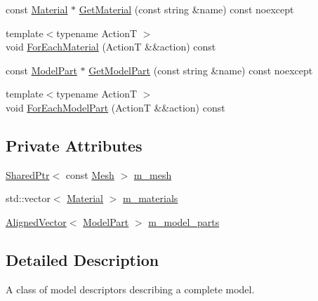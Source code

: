 \begin{DoxyCompactItemize}
\item 
const \mbox{\hyperlink{classmage_1_1rendering_1_1_material}{Material}} $\ast$ \mbox{\hyperlink{classmage_1_1rendering_1_1_model_descriptor_af731849a1aed71ae8e049571850e7f2e}{Get\+Material}} (const string \&name) const noexcept
\item 
{\footnotesize template$<$typename ActionT $>$ }\\void \mbox{\hyperlink{classmage_1_1rendering_1_1_model_descriptor_a4e95ae12e0c952c76aaaf1ee457aed07}{For\+Each\+Material}} (ActionT \&\&action) const
\item 
const \mbox{\hyperlink{structmage_1_1rendering_1_1_model_part}{Model\+Part}} $\ast$ \mbox{\hyperlink{classmage_1_1rendering_1_1_model_descriptor_a451867513276357536075085edf88592}{Get\+Model\+Part}} (const string \&name) const noexcept
\item 
{\footnotesize template$<$typename ActionT $>$ }\\void \mbox{\hyperlink{classmage_1_1rendering_1_1_model_descriptor_a9b217d2536bdd34c4b8b93ccf2ef62d3}{For\+Each\+Model\+Part}} (ActionT \&\&action) const
\end{DoxyCompactItemize}
\subsection*{Private Attributes}
\begin{DoxyCompactItemize}
\item 
\mbox{\hyperlink{namespacemage_a1e01ae66713838a7a67d30e44c67703e}{Shared\+Ptr}}$<$ const \mbox{\hyperlink{classmage_1_1rendering_1_1_mesh}{Mesh}} $>$ \mbox{\hyperlink{classmage_1_1rendering_1_1_model_descriptor_a18fd5970f038726fd200e60f3c5ad33e}{m\+\_\+mesh}}
\item 
std\+::vector$<$ \mbox{\hyperlink{classmage_1_1rendering_1_1_material}{Material}} $>$ \mbox{\hyperlink{classmage_1_1rendering_1_1_model_descriptor_ae88269763478f47e5d6c0086a4aeb33b}{m\+\_\+materials}}
\item 
\mbox{\hyperlink{namespacemage_a8664bfb5ce2179fc64eae9f82c8a5ba8}{Aligned\+Vector}}$<$ \mbox{\hyperlink{structmage_1_1rendering_1_1_model_part}{Model\+Part}} $>$ \mbox{\hyperlink{classmage_1_1rendering_1_1_model_descriptor_a2c2eda62e6f2c7f6274a0f829b6abfa1}{m\+\_\+model\+\_\+parts}}
\end{DoxyCompactItemize}


\subsection{Detailed Description}
A class of model descriptors describing a complete model. 

